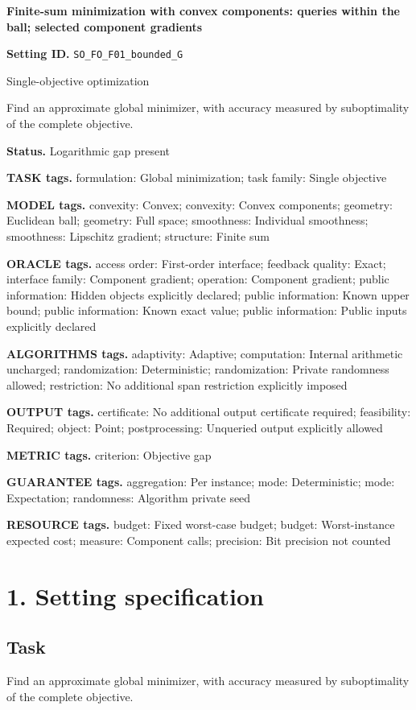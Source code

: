\documentclass[10pt,a4paper]{article}
\begin{document}
\raggedright

{\LARGE\bfseries\sffamily\color{AtlasNavy} Finite-sum minimization with convex components: queries within the ball; selected component gradients\par}\vspace{5pt}
\textbf{Setting ID.} \texttt{SO\_\allowbreak{}FO\_\allowbreak{}F01\_\allowbreak{}bounded\_\allowbreak{}G}

Single-objective optimization

Find an approximate global minimizer, with accuracy measured by suboptimality of the complete objective.

\textbf{Status.} Logarithmic gap present

\textbf{TASK tags.} formulation: Global minimization; task family: Single objective

\textbf{MODEL tags.} convexity: Convex; convexity: Convex components; geometry: Euclidean ball; geometry: Full space; smoothness: Individual smoothness; smoothness: Lipschitz gradient; structure: Finite sum

\textbf{ORACLE tags.} access order: First-order interface; feedback quality: Exact; interface family: Component gradient; operation: Component gradient; public information: Hidden objects explicitly declared; public information: Known upper bound; public information: Known exact value; public information: Public inputs explicitly declared

\textbf{ALGORITHMS tags.} adaptivity: Adaptive; computation: Internal arithmetic uncharged; randomization: Deterministic; randomization: Private randomness allowed; restriction: No additional span restriction explicitly imposed

\textbf{OUTPUT tags.} certificate: No additional output certificate required; feasibility: Required; object: Point; postprocessing: Unqueried output explicitly allowed

\textbf{METRIC tags.} criterion: Objective gap

\textbf{GUARANTEE tags.} aggregation: Per instance; mode: Deterministic; mode: Expectation; randomness: Algorithm private seed

\textbf{RESOURCE tags.} budget: Fixed worst-case budget; budget: Worst-instance expected cost; measure: Component calls; precision: Bit precision not counted

\section{1. Setting specification}
\subsection{Task}
Find an approximate global minimizer, with accuracy measured by suboptimality of the complete objective.
\end{document}
